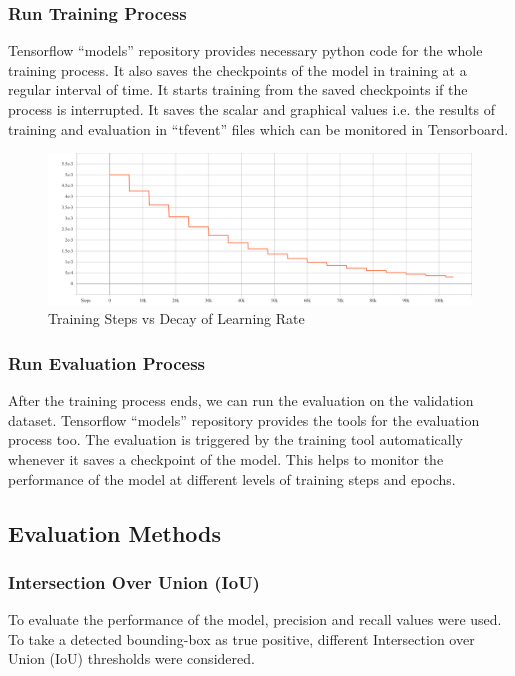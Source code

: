 \documentclass[conference]{IEEEtran}
\begin{document}
\subsubsection{Run Training Process}
Tensorflow ``models'' repository provides necessary python code for the whole training process. It also saves the checkpoints of the model in training at a regular interval of time. It starts training from the saved checkpoints if the process is interrupted\cite{tf_models_repo}. It saves the scalar and graphical values i.e. the results of training and evaluation in ``tfevent'' files which can be monitored in Tensorboard\cite{manetensorboard}.

\begin{figure}
  \centering
  \includegraphics[width=.98\columnwidth]{img/learning_rate}
  \caption{Training Steps vs Decay of Learning Rate}
  \label{fig:learning_rate}
\end{figure}        
        
\subsubsection{Run Evaluation Process}
After the training process ends, we can run the evaluation on the validation dataset. Tensorflow ``models'' repository provides the tools for the evaluation process too. The evaluation is triggered by the training tool automatically whenever it saves a checkpoint of the model\cite{tf_models_repo}. This helps to monitor the performance of the model at different levels of training steps and epochs.
 
\subsection{Evaluation Methods}
\subsubsection{Intersection Over Union (IoU)}
To evaluate the performance of the model, precision and recall values were used. To take a detected bounding-box as true positive, different Intersection over Union (IoU) thresholds were considered.
    
\end{document}
